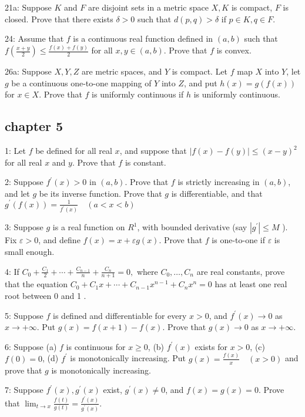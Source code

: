\documentclass{article}
\begin{document}
21a: Suppose $K$ and $F$ are disjoint sets in a metric space $X, K$ is compact, $F$ is closed. Prove that there exists $\delta>0$ such that $d(p, q)>\delta$ if $p \in K, q \in F$. 

24: Assume that $f$ is a continuous real function defined in $(a, b)$ such that $f\left(\frac{x+y}{2}\right) \leq \frac{f(x)+f(y)}{2}$ for all $x, y \in(a, b)$. Prove that $f$ is convex.

26a: Suppose $X, Y, Z$ are metric spaces, and $Y$ is compact. Let $f$ map $X$ into $Y$, let $g$ be a continuous one-to-one mapping of $Y$ into $Z$, and put $h(x)=g(f(x))$ for $x \in X$. Prove that $f$ is uniformly continuous if $h$ is uniformly continuous.

\subsection*{chapter 5}
1: Let $f$ be defined for all real $x$, and suppose that $|f(x)-f(y)| \leq(x-y)^{2}$for all real $x$ and $y$. Prove that $f$ is constant.

2: Suppose $f^{\prime}(x)>0$ in $(a, b)$. Prove that $f$ is strictly increasing in $(a, b)$, and let $g$ be its inverse function. Prove that $g$ is differentiable, and that$g^{\prime}(f(x))=\frac{1}{f^{\prime}(x)} \quad(a<x<b)$

3: Suppose $g$ is a real function on $R^{1}$, with bounded derivative (say $\left|g^{\prime}\right| \leq M$ ). Fix $\varepsilon>0$, and define $f(x)=x+\varepsilon g(x)$. Prove that $f$ is one-to-one if $\varepsilon$ is small enough.

4: If $C_{0}+\frac{C_{1}}{2}+\cdots+\frac{C_{n-1}}{n}+\frac{C_{n}}{n+1}=0,$ where $C_{0}, \ldots, C_{n}$ are real constants, prove that the equation $C_{0}+C_{1} x+\cdots+C_{n-1} x^{n-1}+C_{n} x^{n}=0$ has at least one real root between 0 and 1 .

5: Suppose $f$ is defined and differentiable for every $x>0$, and $f^{\prime}(x) \rightarrow 0$ as $x \rightarrow+\infty$. Put $g(x)=f(x+1)-f(x)$. Prove that $g(x) \rightarrow 0$ as $x \rightarrow+\infty$.

6: Suppose (a) $f$ is continuous for $x \geq 0$, (b) $f^{\prime}(x)$ exists for $x>0$, (c) $f(0)=0$, (d) $f^{\prime}$ is monotonically increasing. Put $g(x)=\frac{f(x)}{x} \quad(x>0)$ and prove that $g$ is monotonically increasing.

7: Suppose $f^{\prime}(x), g^{\prime}(x)$ exist, $g^{\prime}(x) \neq 0$, and $f(x)=g(x)=0$. Prove that $\lim _{t \rightarrow x} \frac{f(t)}{g(t)}=\frac{f^{\prime}(x)}{g^{\prime}(x)}.$
\end{document}
